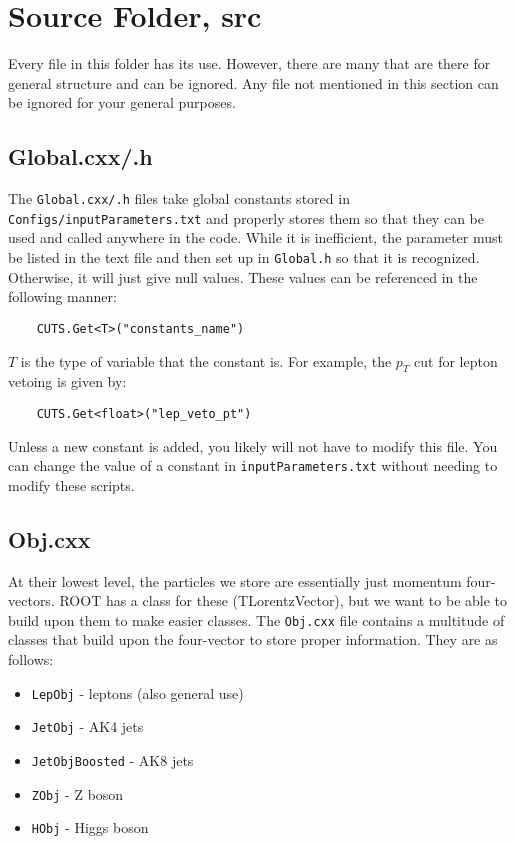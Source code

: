 \section{Source Folder, src}\label{sec:src}
Every file in this folder has its use. However, there are many that are there for general structure and can be ignored. Any file not mentioned in this section can be ignored for your general purposes.

\subsection{Global.cxx/.h}
The \verb|Global.cxx/.h| files take global constants stored in \verb|Configs/inputParameters.txt| and properly stores them so that they can be used and called anywhere in the code. While it is inefficient, the parameter must be listed in the text file and then set up in \verb|Global.h| so that it is recognized. Otherwise, it will just give null values. These values can be referenced in the following manner:

\begin{verbatim}
    CUTS.Get<T>("constants_name")
\end{verbatim}

\noindent $T$ is the type of variable that the constant is. For example, the $p_T$ cut for lepton vetoing is given by:

\begin{verbatim}
    CUTS.Get<float>("lep_veto_pt")
\end{verbatim}

\noindent Unless a new constant is added, you likely will not have to modify this file. You can change the value of a constant in \verb|inputParameters.txt| without needing to modify these scripts.

\subsection{Obj.cxx}
At their lowest level, the particles we store are essentially just momentum four-vectors. ROOT has a class for these (TLorentzVector), but we want to be able to build upon them to make easier classes. The \verb|Obj.cxx| file contains a multitude of classes that build upon the four-vector to store proper information. They are as follows:

\begin{itemize}
    \item \verb|LepObj| - leptons (also general use)
    \item \verb|JetObj| - AK4 jets
    \item \verb|JetObjBoosted| - AK8 jets
    \item \verb|ZObj| - Z boson
    \item \verb|HObj| - Higgs boson
\end{itemize}


